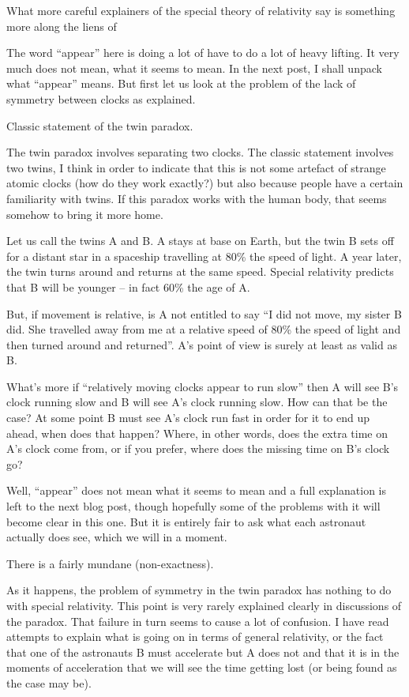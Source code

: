 \documentclass{report}
\begin{document}
What more careful explainers of the special theory of relativity say is something more along the liens of 


The word ``appear'' here is doing a lot of have to do a lot of heavy lifting. It very much does not mean, what it seems to mean. In the next post, I shall unpack what ``appear'' means. But first let us look at the problem of the lack of symmetry between clocks as explained.

Classic statement of the twin paradox.

The twin paradox involves separating two clocks. The classic statement involves two twins, I think in order to indicate that this is not some artefact of strange atomic clocks (how do they work exactly?) but also because people have a certain familiarity with twins. If this paradox works with the human body, that seems somehow to bring it more home.

Let us call the twins A and B. A stays at base on Earth, but the twin B sets off for a distant star in a spaceship travelling at 80\% the speed of light. A year later, the twin turns around and returns at the same speed. Special relativity predicts that B will be younger -- in fact 60\% the age of A.

But, if movement is relative, is A not entitled to say ``I did not move, my sister B did. She travelled away from  me at a relative speed of 80\% the speed of light and then turned around and returned''. A's point of view is surely at least as valid as B.

What's more if ``relatively moving clocks appear to run slow'' then A will see B's clock running slow and B will see A's clock running slow. How can that be the case? At some point B must see A's clock run fast in order for it to end up ahead, when does that happen? Where, in other words, does the extra time on A's clock come from, or if you prefer, where does the missing time on B's clock go?

Well, ``appear'' does not mean what it seems to mean and a full explanation is left to the next blog post, though hopefully some of the problems with it will become clear in this one. But it is entirely fair to ask what each astronaut actually does see, which we will in a moment.

There is a fairly mundane (non-exactness).

As it happens, the problem of symmetry in the twin paradox has nothing to do with special relativity. This point is very rarely explained clearly in discussions of the paradox. That failure in turn seems to cause a lot of confusion. I have read attempts to explain what is going on in terms of general relativity, or the fact that one of the astronauts B must accelerate but A does not and that it is in the moments of acceleration that we will see the time getting lost (or being found as the case may be).
\end{document}
